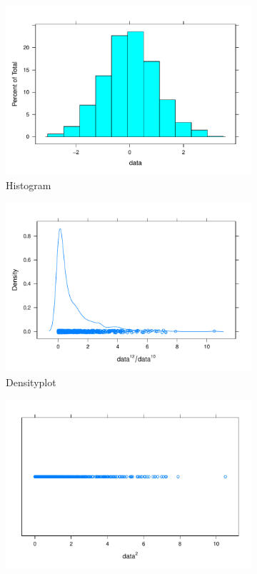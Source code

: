 \documentclass{article}
\begin{document}
\begin{figure}[h]
    \centering
    \begin{subfigure}{.48\textwidth}
        \includegraphics[width=\textwidth]{w1_histogram.pdf}
        \caption{Histogram}
        \label{fig:hist}
    \end{subfigure}
    \begin{subfigure}{.48\textwidth}
        \includegraphics[width=\textwidth]{w1_density.pdf}
        \caption{Densityplot}
        \label{fig:w1hist}
    \end{subfigure}
    \begin{subfigure}{.48\textwidth}
        \includegraphics[width=\textwidth]{w1_stripplot.pdf}

\end{subfigure}
\end{figure}
\end{document}
